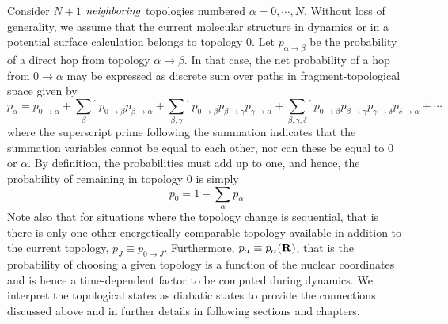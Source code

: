 Consider $N+1$ $\it{neighboring}$  topologies numbered
$\alpha=0,\cdots,N$.  Without loss of generality, we assume that the current molecular structure 
in dynamics or in a potential surface calculation belongs to topology $0$. Let
$p_{\alpha \rightarrow \beta}$ be the
probability of a direct hop from topology $\alpha \rightarrow \beta$. In that case, the
net probability of a hop from $0 \rightarrow \alpha$ may be expressed as discrete sum over
paths in fragment-topological space given by
\begin{equation}
p_\alpha = p_{0 \rightarrow \alpha} + \sum_{\beta}{}^{\prime} ~p_{0 \rightarrow \beta} p_{\beta \rightarrow \alpha} +
\sum_{\beta,\gamma}{}^\prime ~p_{0 \rightarrow \beta} p_{\beta \rightarrow \gamma} p_{\gamma \rightarrow \alpha} +
\sum_{\beta,\gamma,\delta}{}^\prime ~p_{0 \rightarrow \beta} p_{\beta \rightarrow \gamma} p_{\gamma \rightarrow \delta} p_{\delta
  \rightarrow \alpha} +
\cdots
\label{pJ}
\end{equation}
where the superscript prime following the summation indicates that the
summation variables cannot be equal to each other, nor can these be equal to $0$ or
$\alpha$. By definition, the probabilities must add
up to one, and hence, the probability of remaining in topology $0$ is simply 
\begin{equation}
p_0 = 1 - \sum_\alpha p_\alpha
\label{p0}
\end{equation}
Note also that for situations where the topology change is sequential, that
is there is only one other energetically comparable topology available in
addition to the current topology, $p_J \equiv p_{0 \rightarrow J}$.
Furthermore, $p_\alpha \equiv p_\alpha({\bf R})$, that is the probability of choosing a
given topology is a function of the nuclear coordinates and is hence a
time-dependent factor to be computed during dynamics. We interpret the topological
states as diabatic states to provide the connections discussed above and in further
details in following sections and chapters.


